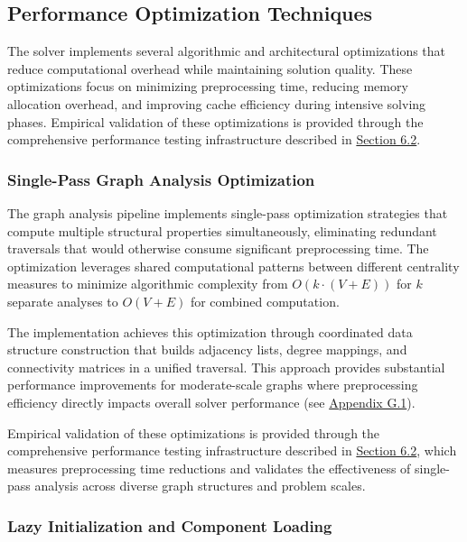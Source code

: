 \subsection{Performance Optimization Techniques}

The solver implements several algorithmic and architectural optimizations that reduce computational overhead while maintaining solution quality. These optimizations focus on minimizing preprocessing time, reducing memory allocation overhead, and improving cache efficiency during intensive solving phases. Empirical validation of these optimizations is provided through the comprehensive performance testing infrastructure described in \hyperref[sec:scalability-analysis]{Section 6.2}.

\subsubsection{Single-Pass Graph Analysis Optimization}

The graph analysis pipeline implements single-pass optimization strategies that compute multiple structural properties simultaneously, eliminating redundant traversals that would otherwise consume significant preprocessing time. The optimization leverages shared computational patterns between different centrality measures to minimize algorithmic complexity from $O(k \cdot (V+E))$ for $k$ separate analyses to $O(V+E)$ for combined computation.

The implementation achieves this optimization through coordinated data structure construction that builds adjacency lists, degree mappings, and connectivity matrices in a unified traversal. This approach provides substantial performance improvements for moderate-scale graphs where preprocessing efficiency directly impacts overall solver performance (see \hyperref[appendix:single-pass-analysis]{Appendix G.1}).

Empirical validation of these optimizations is provided through the comprehensive performance testing infrastructure described in \hyperref[sec:scalability-analysis]{Section 6.2}, which measures preprocessing time reductions and validates the effectiveness of single-pass analysis across diverse graph structures and problem scales.

\subsubsection{Lazy Initialization and Component Loading}

